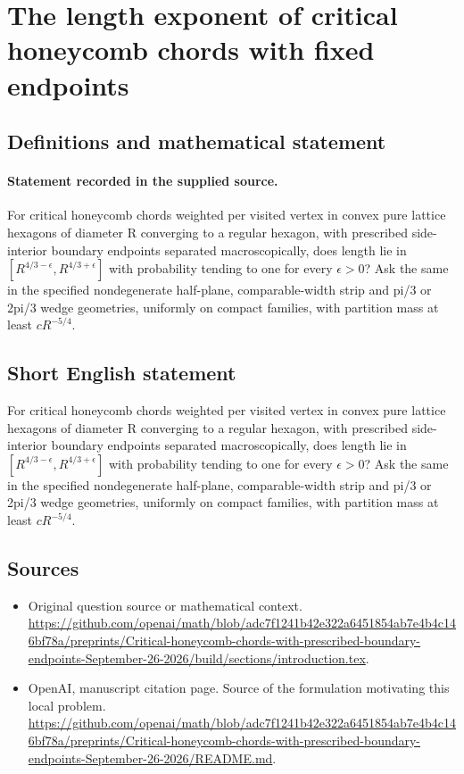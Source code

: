 \documentclass[11pt]{article}
\begin{document}
\section*{The length exponent of critical honeycomb chords with fixed endpoints}\label{30007370}
\subsection{Definitions and mathematical statement}
\paragraph{Statement recorded in the supplied source.}
For critical honeycomb chords weighted per visited vertex in convex pure lattice hexagons of diameter R converging to a regular hexagon, with prescribed side-interior boundary endpoints separated macroscopically, does length lie in $[R^{4/3-\epsilon },R^{4/3+\epsilon }]$ with probability tending to one for every $\epsilon >0$? Ask the same in the specified nondegenerate half-plane, comparable-width strip and pi/3 or 2pi/3 wedge geometries, uniformly on compact families, with partition mass at least $cR^{-5/4}$.
\subsection{Short English statement}
For critical honeycomb chords weighted per visited vertex in convex pure lattice hexagons of diameter R converging to a regular hexagon, with prescribed side-interior boundary endpoints separated macroscopically, does length lie in $[R^{4/3-\epsilon },R^{4/3+\epsilon }]$ with probability tending to one for every $\epsilon >0$? Ask the same in the specified nondegenerate half-plane, comparable-width strip and pi/3 or 2pi/3 wedge geometries, uniformly on compact families, with partition mass at least $cR^{-5/4}$.
\subsection{Sources}
\begin{itemize}
\item[S1] Original question source or mathematical context.
\url{https://github.com/openai/math/blob/adc7f1241b42e322a6451854ab7e4b4c146bf78a/preprints/Critical-honeycomb-chords-with-prescribed-boundary-endpoints-September-26-2026/build/sections/introduction.tex}.
\item[S2] OpenAI, manuscript citation page. Source of the formulation motivating this local problem.
\url{https://github.com/openai/math/blob/adc7f1241b42e322a6451854ab7e4b4c146bf78a/preprints/Critical-honeycomb-chords-with-prescribed-boundary-endpoints-September-26-2026/README.md}.
\end{itemize}
\end{document}

